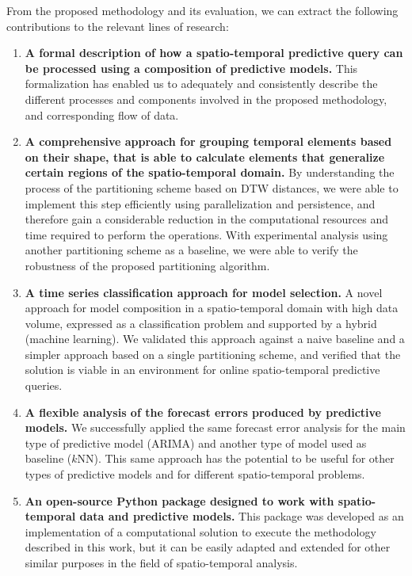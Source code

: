From the proposed methodology and its evaluation, we can extract the following contributions to the relevant lines of research:

\begin{enumerate}
\item \textbf{A formal description of how a spatio-temporal predictive query can be processed using a composition of predictive models.} This formalization has enabled us to adequately and consistently describe the different processes and components involved in the proposed methodology, and corresponding flow of data.

\item \textbf{A comprehensive approach for grouping temporal elements based on their shape, that is able to calculate elements that generalize certain regions of the spatio-temporal domain.} By understanding the process of the partitioning scheme based on DTW distances, we were able to implement this step efficiently using parallelization and persistence, and therefore gain a considerable reduction in the computational resources and time required to perform the operations. With experimental analysis using another partitioning scheme as a baseline, we were able to verify the robustness of the proposed partitioning algorithm.

\item \textbf{A time series classification approach for model selection.} A novel approach for model composition in a spatio-temporal domain with high data volume, expressed as a classification problem and supported by a hybrid (machine learning). We validated this approach against a naive baseline and a simpler approach based on a single partitioning scheme, and verified that the solution is viable in an environment for online spatio-temporal predictive queries.

\item \textbf{A flexible analysis of the forecast errors produced by predictive models.} We successfully applied the same forecast error analysis for the main type of predictive model (ARIMA) and another type of model used as baseline ($k$NN). This same approach has the potential to be useful for other types of predictive models and for different spatio-temporal problems.

\item \textbf{An open-source Python package designed to work with spatio-temporal data and predictive models.} This package was developed as an implementation of a computational solution to execute the methodology described in this work, but it can be easily adapted and extended for other similar purposes in the field of spatio-temporal analysis.
\end{enumerate}


